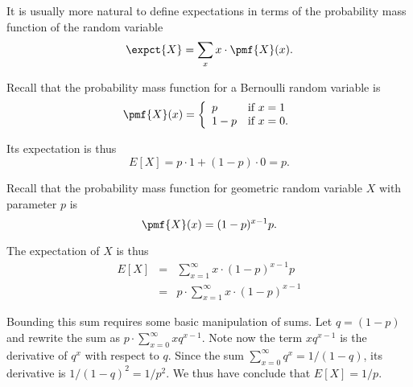 \begin{flex}
\begin{gram}
It is usually more natural to define expectations in terms of the
probability mass function of the random variable
\[
\expct{X} = \sum_{x} x \cdot \pmf{X}(x).
\] 
\end{gram}

\begin{example}
Recall that the probability mass function for a Bernoulli random
variable is  
\[
\pmf{X}(x) = 
\left\{
\begin{array}{ll}
p & \mbox{if}~x = 1
\\
1-p & \mbox{if}~x = 0.
\end{array}
\right.
\]

Its expectation is thus
\[
E[X] = p \cdot 1 + (1-p) \cdot 0 = p.
\]

\end{example}

\begin{example}
Recall that the probability mass function for geometric random
variable $X$ with parameter $p$ is 
%
\[
\pmf{X}(x) = (1-p)^{x-1} p.
\]

The expectation of $X$ is thus
\[
\begin{array}{lll}
E[X] & = & \displaystyle\sum_{x = 1}^{\infty}{x \cdot (1-p)^{x-1} p}
\\
& = &  p\cdot \displaystyle\sum_{x = 1}^{\infty}{x \cdot (1-p)^{x-1}}
\end{array}
\]

Bounding this sum requires some basic manipulation of sums.
%
Let $q = (1-p)$ and rewrite the sum as $p \cdot \sum_{x = 0}^{\infty}{xq^{x-1}}$.
%
Note now the term $xq^{x-1}$ is the derivative of $q^{x}$ with respect
to $q$.
%
Since the sum $\sum_{x=0}^{\infty}{q^x} = 1/(1-q)$, its derivative is
$1/(1-q)^2 = 1/p^2$.
%
We thus have conclude that $E[X] = 1/p$.
\end{example}


\end{flex}
